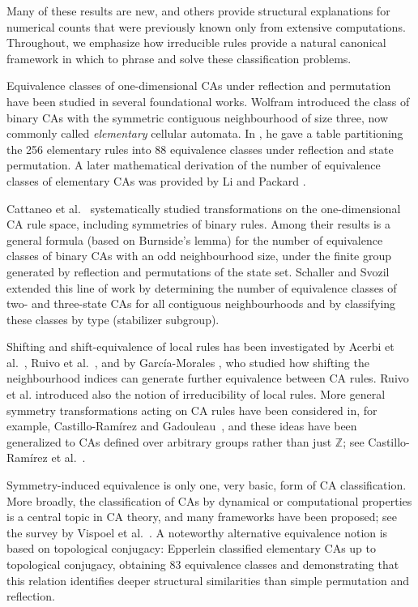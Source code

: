 \documentclass[a4paper]{article}
\begin{document}
Many of these results are new, and others provide structural explanations for
numerical counts that were previously known only from extensive computations.
Throughout, we emphasize how irreducible rules provide a natural canonical
framework in which to phrase and solve these classification problems.


Equivalence classes of one-dimensional CAs under reflection and permutation
have been studied in several foundational works. Wolfram \cite{Wolfram1983}
introduced the class of binary CAs with the symmetric contiguous neighbourhood
of size three, now commonly called \emph{elementary} cellular automata. In
\cite{wolfram-1986}, he gave a table partitioning the 256 elementary rules into
88 equivalence classes under reflection and state permutation. A later
mathematical derivation of the number of equivalence classes of elementary CAs
was provided by Li and Packard \cite{Li1990TheSO}.

Cattaneo et al.\ \cite{CATTANEO19971593} systematically
studied transformations on the one-dimensional CA rule space, including
symmetries of binary rules. Among their results is a general formula (based on
Burnside's lemma) for the number of equivalence classes of binary CAs with an
odd neighbourhood size, under the finite group generated by reflection and
permutations of the state set. Schaller and Svozil \cite{SCHALLER2025100298}
extended this line of work by determining the number of equivalence classes of
two- and three-state CAs for all contiguous neighbourhoods and by classifying
these classes by type (stabilizer subgroup).

Shifting and shift-equivalence of local rules has been investigated by
Acerbi et al.~\cite{10.1007/978-3-540-73001-9_1},
Ruivo et al.\
\cite{RUIVO2018280}, and by Garc{\'i}a-Morales \cite{GARCIAMORALES2013276}, who
studied how shifting the neighbourhood indices can generate further equivalence
between CA rules.
Ruivo et al. introduced also the notion of irreducibility of local rules.
More general symmetry transformations acting on CA rules
have been considered in, for example, Castillo-Ram{\'i}rez and Gadouleau~\cite{CASTILLORAMIREZ2020104533}, and
these ideas have been generalized to CAs defined over arbitrary groups rather
than just $\mathbb{Z}$; see Castillo-Ram{\'i}rez et al.\ \cite{Castillo-Ramirez03072023}.

Symmetry-induced equivalence is only one, very basic, form of CA classification.
More broadly, the classification of CAs by dynamical or computational
properties is a central topic in CA theory, and many frameworks have been
proposed; see the survey by Vispoel et al.\ \cite{VISPOEL2022133074}. A
noteworthy alternative equivalence notion is based on topological conjugacy:
Epperlein \cite{epperlein2015classification, epperlein2017} classified elementary CAs up to
topological conjugacy, obtaining 83 equivalence classes and demonstrating that
this relation identifies deeper structural similarities than simple permutation
and reflection.
\end{document}
